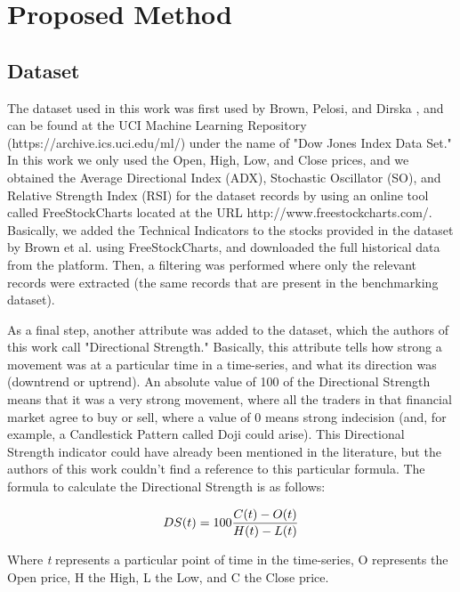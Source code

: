 \section{Proposed Method}
\label{proposed-method}

\subsection{Dataset}
\label{dataset}

The dataset used in this work was first used by Brown, Pelosi, and Dirska \cite{brown2013dynamic}, and can be found at the UCI Machine Learning Repository (https://archive.ics.uci.edu/ml/) under the name of "Dow Jones Index Data Set." In this work we only used the Open, High, Low, and Close prices, and we obtained the Average Directional Index (ADX), Stochastic Oscillator (SO), and Relative Strength Index (RSI) for the dataset records by using an online tool called FreeStockCharts located at the URL http://www.freestockcharts.com/. Basically, we added the Technical Indicators to the stocks provided in the dataset by Brown et al. using FreeStockCharts, and downloaded the full historical data from the platform. Then, a filtering was performed where only the relevant records were extracted (the same records that are present in the benchmarking dataset).

As a final step, another attribute was added to the dataset, which the authors of this work call "Directional Strength." Basically, this attribute tells how strong a movement was at a particular time in a time-series, and what its direction was (downtrend or uptrend). An absolute value of 100 of the Directional Strength means that it was a very strong movement, where all the traders in that financial market agree to buy or sell, where a value of 0 means strong indecision (and, for example, a Candlestick Pattern called Doji could arise). This Directional Strength indicator could have already been mentioned in the literature, but the authors of this work couldn't find a reference to this particular formula. The formula to calculate the Directional Strength is as follows:

\begin{equation} \label{directional-strength}
  DS(t) = 100{{C(t) - O(t)} \over {H(t) - L(t)}}
\end{equation}

Where \textit{t} represents a particular point of time in the time-series, O represents the Open price, H the High, L the Low, and C the Close price.

